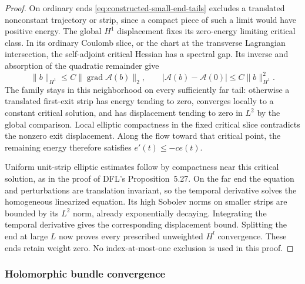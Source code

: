 \documentclass[11pt]{amsart}
\theoremstyle{definition}
\theoremstyle{remark}
\theoremstyle{plain}
\begin{document}
\begin{proof}
On ordinary ends \eqref{eq:constructed-small-end-tails} excludes a
translated nonconstant trajectory or strip, since a compact piece of
such a limit would have positive energy. The global $H^1$ displacement
fixes its zero-energy limiting critical class. In its ordinary Coulomb
slice, or the chart at the transverse Lagrangian intersection, the
self-adjoint critical Hessian has a spectral gap. Its inverse and
absorption of the quadratic remainder give
\[
 \|b\|_{H^1}\leq C\|\operatorname{grad}\mathcal A(b)\|_2,\qquad
             |\mathcal A(b)-\mathcal A(0)|\leq C\|b\|_{H^1}^2.
\]
The family stays in this neighborhood on every sufficiently far tail:
otherwise a translated first-exit strip has energy tending to zero,
converges locally to a constant critical solution, and has displacement
tending to zero in $L^2$ by the global comparison. Local elliptic
compactness in the fixed critical slice contradicts the nonzero exit
displacement. Along the flow toward that critical point, the remaining
energy therefore satisfies $e'(t)\leq-ce(t)$.

Uniform unit-strip elliptic estimates follow by compactness near this
critical solution, as in the proof of DFL's Proposition~5.27. On the
far end the equation and perturbations are translation invariant, so
the temporal derivative solves the homogeneous linearized equation.
Its high Sobolev norms on smaller strips are bounded by its $L^2$
norm, already exponentially decaying. Integrating the temporal
derivative gives the corresponding displacement bound. Splitting the
end at large $L$ now proves every prescribed unweighted $H^l$
convergence. These ends retain weight zero. No index-at-most-one
exclusion is used in this proof.
\end{proof}

\subsubsection{Holomorphic bundle convergence}
\end{document}
